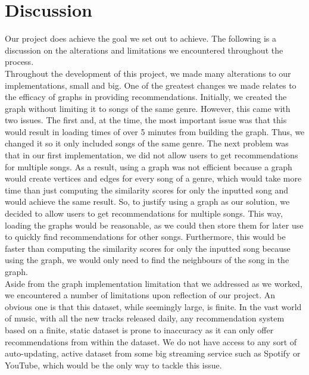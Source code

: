 \documentclass[fontsize=11pt]{article}
\begin{document}
\section*{Discussion}

\hspace{\parindent} Our project does achieve the goal we set out to achieve. The following is a discussion on the alterations and limitations we encountered throughout the process. \\

\hspace{\parindent} Throughout the development of this project, we made many alterations to our implementations, small and big. One of the greatest changes we made relates to the efficacy of graphs in providing recommendations. Initially, we created the graph without limiting it to songs of the same genre. However, this came with two issues. The first and, at the time, the most important issue was that this would result in loading times of over 5 minutes from building the graph. Thus, we changed it so it only included songs of the same genre. The next problem was that in our first implementation, we did not allow users to get recommendations for multiple songs. As a result, using a graph was not efficient because a graph would create vertices and edges for every song of a genre, which would take more time than just computing the similarity scores for only the inputted song and would achieve the same result. So, to justify using a graph as our solution, we decided to allow users to get recommendations for multiple songs. This way, loading the graphs would be reasonable, as we could then store them for later use to quickly find recommendations for other songs. Furthermore, this would be faster than computing the similarity scores for only the inputted song because using the graph, we would only need to find the neighbours of the song in the graph. \\
	
\hspace{\parindent} Aside from the graph implementation limitation that we addressed as we worked, we encountered a number of limitations upon reflection of our project. An obvious one is that this dataset, while seemingly large, is finite. In the vast world of music, with all the new tracks released daily, any recommendation system based on a finite, static dataset is prone to inaccuracy as it can only offer recommendations from within the dataset. We do not have access to any sort of auto-updating, active dataset from some big streaming service such as Spotify or YouTube, which would be the only way to tackle this issue. \\
\end{document}
